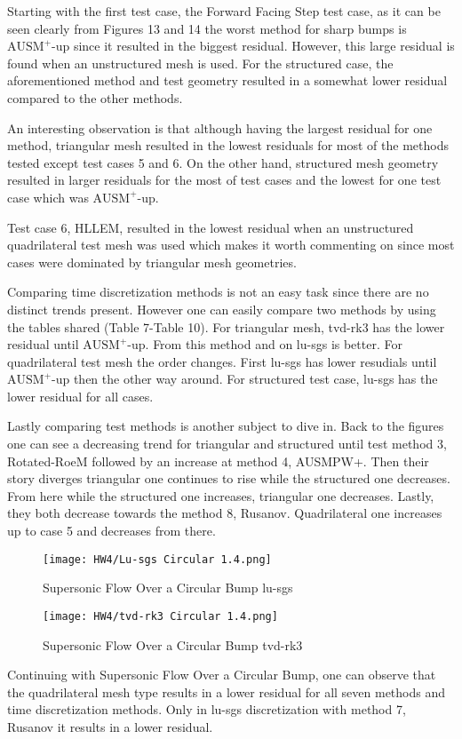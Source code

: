 \documentclass[a4paper, 12pt]{article}
\begin{document}
Starting with the first test case, the Forward Facing Step test case, as it can be seen clearly from Figures 13 and 14 the worst method for sharp bumps is $\text{AUSM}^+\text{-up}$ since it resulted in the biggest residual. However, this large residual is found when an unstructured mesh is used. For the structured case, the aforementioned method and test geometry resulted in a somewhat lower residual compared to the other methods. \\\par
An interesting observation is that although having the largest residual for one method, triangular mesh resulted in the lowest residuals for most of the methods tested except test cases 5 and 6. On the other hand, structured mesh geometry resulted in larger residuals for the most of test cases and the lowest for one test case which was $\text{AUSM}^+\text{-up}$. \\\par
Test case 6, HLLEM, resulted in the lowest residual when an unstructured quadrilateral test mesh was used which makes it worth commenting on since most cases were dominated by triangular mesh geometries.\\\par
Comparing time discretization methods is not an easy task since there are no distinct trends present. However one can easily compare two methods by using the tables shared (Table 7-Table 10). For triangular mesh, tvd-rk3 has the lower residual until $\text{AUSM}^+\text{-up}$. From this method and on lu-sgs is better. For quadrilateral test mesh the order changes. First lu-sgs has lower resudials until $\text{AUSM}^+\text{-up}$ then the other way around. For structured test case, lu-sgs has the lower residual for all cases.\\\par
Lastly comparing test methods is another subject to dive in. Back to the figures one can see a decreasing trend for triangular and structured until test method 3, Rotated-RoeM followed by an increase at method 4, AUSMPW+. Then their story diverges triangular one continues to rise while the structured one decreases. From here while the structured one increases, triangular one decreases. Lastly, they both decrease towards the method 8, Rusanov. Quadrilateral one increases up to case 5 and decreases from there.

\begin{figure}[H]
    \centering
    \texttt{[image: HW4/Lu-sgs Circular 1.4.png]}
    \caption{Supersonic Flow Over a Circular Bump lu-sgs}
\end{figure}
\begin{figure}[H]
    \centering
    \texttt{[image: HW4/tvd-rk3 Circular 1.4.png]}
    \caption{Supersonic Flow Over a Circular Bump tvd-rk3}
\end{figure}
Continuing with Supersonic Flow Over a Circular Bump, one can observe that the quadrilateral mesh type results in a lower residual for all seven methods and time discretization methods. Only in lu-sgs discretization with method 7, Rusanov it results in a lower residual.\\\par
\end{document}

